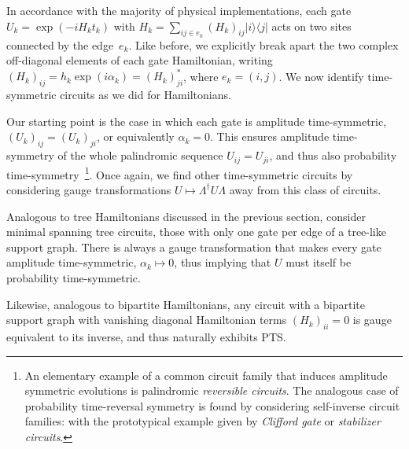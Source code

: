\documentclass[aps,prx,10pt,
               superscriptaddress,
               twocolumn,
               longbibliography,
showpacs]{revtex4-1}
\newcommand{\yo}[1]{\textcolor{dblue}{\textbf{[}#1\textbf{]}}}
\theoremstyle{plain}
\theoremstyle{definition}
\newcommand{\bra}[1]{\mbox{$\langle #1|$}}
\newcommand{\ket}[1]{\ensuremath{|#1\rangle}}
\newcommand{\ind}[1]{_{#1}}  %
\begin{document}
In accordance with the majority of physical implementations, each gate
$U\ind{k} = \exp(-i H\ind{k} t\ind{k} )$ with $H\ind{k} = \sum_{ij \in e_k} (H\ind{k})_{ij} \ket{i} \bra{j}$
acts on two sites connected by the edge~$e_k$.
Like before, we explicitly break apart the two complex off-diagonal elements of each gate Hamiltonian, writing
$(H\ind{k})_{ij} = h_k \exp(i \alpha_k) = (H\ind{k})_{ji}^\ast$, where $e_k = (i,j)$.
We now identify time-symmetric circuits as we did for Hamiltonians.


Our starting point is the case in which each gate is amplitude time-symmetric,
$(U\ind{k})_{ij} = (U\ind{k})_{ji}$, or equivalently
$\alpha_k = 0$. This ensures amplitude time-symmetry of the whole palindromic sequence
$U_{ij} = U_{ji}$, and thus also probability
time-symmetry~\footnote{An elementary example of a common circuit family that
induces amplitude symmetric evolutions is palindromic {\it reversible
circuits}.  The analogous case of probability time-reversal symmetry is found
by considering self-inverse circuit families: with
the prototypical example given by {\it Clifford gate} or {\it stabilizer
circuits}.}. Once again, we find other time-symmetric circuits by considering gauge transformations $U \mapsto \Lambda^{\dagger} U \Lambda$ away from this class of circuits.

Analogous to tree Hamiltonians discussed in the previous section, consider minimal spanning tree circuits, those with only one gate per edge of a tree-like support graph.
There is always a gauge transformation that makes every gate amplitude time-symmetric, $\alpha_k \mapsto 0$, thus implying that $U$ must itself be probability time-symmetric.

Likewise, analogous to bipartite Hamiltonians, any circuit with a bipartite support graph with vanishing diagonal Hamiltonian terms
$(H\ind{k})_{ii} = 0$
is gauge equivalent to its inverse,
and thus naturally exhibits PTS.


\end{document}
